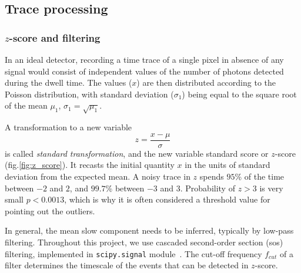 \documentclass[a4paper,11pt,oneside,]{article}
\begin{document}
\subsection{Trace processing}

\subsubsection{$z$-score and filtering}

In an ideal detector, recording a time trace of a single pixel in absence of any signal would consist of independent values of the number of photons detected during the dwell time.
The values ($x$) are then distributed according to the Poisson distribution, with standard deviation ($\sigma_1$) being equal to the square root of the mean $\mu_1$, $\sigma_1=\sqrt{\mu_1}$.

A transformation to a new variable %
$$z=\frac{x-\mu}{\sigma}$$
is called {\it standard transformation}, and the new variable standard score or $z$-score (fig.\ref{fig:z_score}). It recasts the initial quantity $x$ in the units of standard deviation from the expected mean. A noisy trace in $z$ spends $95$\% of the time between $-2$ and $2$, and $99.7$\% between $-3$ and $3$. Probability of $z>3$ is very small $p<0.0013$, which is why it is often considered a threshold value for pointing out the outliers.

In general, the mean slow component needs to be inferred, typically by low-pass filtering. Throughout this project, we use cascaded second-order section (sos) filtering, implemented in \verb|scipy.signal| module~\cite{2020SciPy-NMeth}. The cut-off frequency $f_{cut}$ of a filter determines the timescale of the events that can be detected in $z$-score. 
\end{document}

